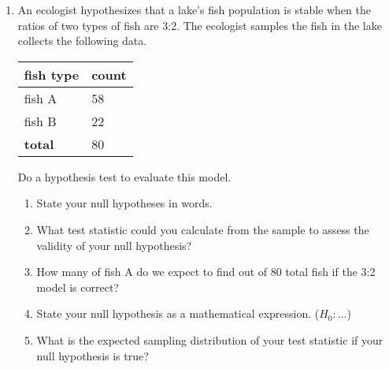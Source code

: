 \documentclass[12pt,fullpage]{amsart}
\begin{document}
\begin{enumerate}
\begin{enumerate}
{        95 percent confidence interval:
        
        -0.7342060 -0.5344877
        
        sample estimates:
        
        prop 1    prop 2
        
        0.2125000 0.8468468
        
   }
\end{enumerate}

\vfill


\item An ecologist hypothesizes that a lake's fish population is stable when the ratios of two types of fish are 3:2. The ecologist samples the fish in the lake collects the following data.

\begin{center}
\begin{tabular}{ll}
\textbf{fish type} & \textbf{count}\\
\hline
fish A & 58\\
fish B & 22\\
\hline
\textbf{total} & 80
\end{tabular}
\end{center}

Do a hypothesis test to evaluate this model.
\begin{enumerate}
\item State your null hypotheses in words.

  
\item What test statistic could you calculate from the sample to assess the validity of your null hypothesis?

  
\item How many of fish A do we expect to find out of 80 total fish if the 3:2 model is correct?

  
\item State your null hypothesis as a mathematical expression. ($H_0: \ldots$)

  
\item What is the expected sampling distribution of your test statistic if your null hypothesis is true?


\end{enumerate}
\end{enumerate}
\end{document}
